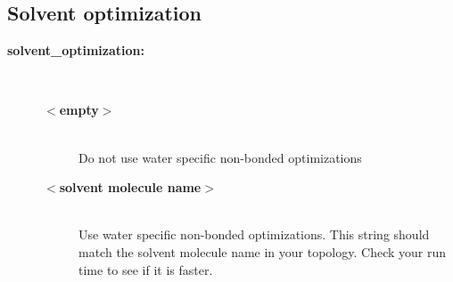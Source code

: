 \subsection{Solvent optimization}
\begin{description}
\item[{\bf solvent\_optimization:}]\mbox{}\\
\vspace{-2ex}\begin{description}
\item[{\bf $<$empty$>$}]\mbox{}\\
Do not use water specific non-bonded optimizations
\item[{\bf $<$solvent molecule name$>$}]\mbox{}\\
Use water specific non-bonded optimizations. This string should match the
solvent molecule name in your topology. Check your run time to see 
if it is faster. 
\end{description}
\end{description}

